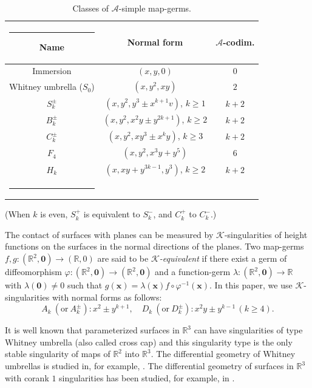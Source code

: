 \documentclass[12pt]{amsart}
\makeatletter
\theoremstyle{plain}
\theoremstyle{definition}
\def\Bline{%
\noalign{\ifnum0=`}\fi\hrule \@height 1pt \futurelet
\reserved@a\@xhline}
\newcommand{\R}{\mathbb{R}}
\renewcommand{\phi}{\varphi}
\renewcommand{\geq}{\geqslant}
\makeatother
\begin{document}
\begin{table}[ht!]
\caption{Classes of $\mathcal{A}$-simple map-germs.}
\centering
\begin{tabular}{ccc}
\Bline
Name & Normal form & $\mathcal{A}$-codim.\\\hline
Immersion & $(x,y,0)$ & $0$ \\
Whitney umbrella ($S_0$) & $(x,y^2,x y)$ & $2$ \\
$S_k^\pm$ & $(x,y^2,y^3 \pm x^{k+1} v)$, $k\geq1$ & $k+2$\\
$B_k^\pm$ & $(x,y^2,x^2y \pm y^{2k+1})$, $k\geq2$ & $k+2$\\
$C_k^\pm$ & $(x,y^2,x y^3 \pm x^k y)$, $k\geq3$ & $k+2$\\
$F_4$ & $(x,y^2,x^3y + y^5)$ & $6$\\
$H_k$ & $(x,x y + y^{3k-1},y^3)$, $k\geq2$ & $k+2$\\\Bline
\end{tabular}

 (When $k$ is even, $S_k^+$ is equivalent to $S_k^-$, and $C_k^+$ to $C_k^-$.)
\label{tab:A-simple}
\end{table}

The contact of surfaces with planes can be measured by $\mathcal{K}$-singularities of height functions on the surfaces in the normal directions of the planes. 
Two map-germs $f, g\colon(\R^2,\bm{0})\to(\R,0)$ are said to be \textit{$\mathcal{K}$-equivalent} if there exist a germ of diffeomorphism $\phi\colon(\R^2,\bm{0})\to(\R^2,\bm{0})$ and a function-germ $\lambda\colon(\R^2,\bm{0})\to\R$ with $\lambda(\bm{0})\ne0$ such that $g(\bm{x}) = \lambda(\bm{x})f \circ \phi^{-1}(\bm{x})$. 
In this paper, we use $\mathcal{K}$-singularities with normal forms as follows:
\[
A_k\ (\text{or}\ A_k^{\pm}) \colon x^2 \pm y^{k+1}, \quad
D_k\ (\text{or}\ D_k^{\pm}) \colon x^2 y \pm y^{k-1}\,(k\geq 4).%
\]

It is well known that parameterized surfaces in $\R^3$ can have singularities of type Whitney umbrella (also called cross cap) and this singularity type is the only stable singularity of maps of $\R^2$ into
$\R^3$.
The differential geometry of Whitney umbrellas is studied in, for example, \cite{BW1998, FH2012, FH2013, GGS2000, HHNSUY2015, HHNUY2014,
Tari2007, West1995}. 
The differential geometry of surfaces in $\mathbb{R}^3$ with corank $1$ singularities has been studied, for example, in \cite{FH2025-2, FH2025, MN-B2015, O-SS2022, O-ST2015, Saji2018, Shimada2024}.
\end{document}
